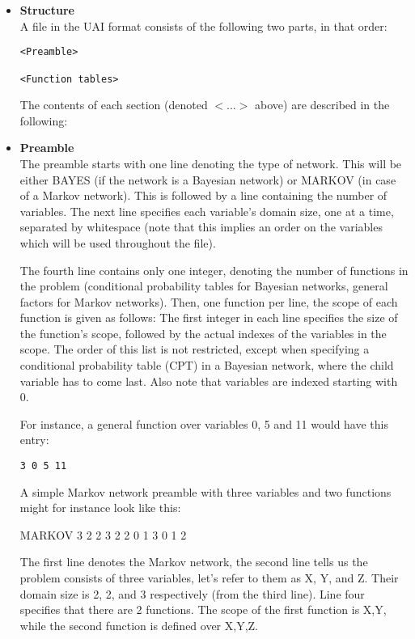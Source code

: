 \documentclass{article}
\begin{document}
\begin{itemize}
\item {\bf Structure}~\\

A file in the UAI format consists of the following two parts, in that order:
\begin{verbatim}
<Preamble>

<Function tables>
\end{verbatim}

The contents of each section (denoted $<...>$ above) are described in the following:
\item {\bf Preamble}~\\

The preamble starts with one line denoting the type of network. This will be either BAYES (if the network is a Bayesian network) or MARKOV (in case of a Markov network). This is followed by a line containing the number of variables. The next line specifies each variable's domain size, one at a time, separated by whitespace (note that this implies an order on the variables which will be used throughout the file).

The fourth line contains only one integer, denoting the number of functions in the problem (conditional probability tables for Bayesian networks, general factors for Markov networks). Then, one function per line, the scope of each function is given as follows: The first integer in each line specifies the size of the function's scope, followed by the actual indexes of the variables in the scope. The order of this list is not restricted, except when specifying a conditional probability table (CPT) in a Bayesian network, where the child variable has to come last. Also note that variables are indexed starting with 0.

For instance, a general function over variables 0, 5 and 11 would have this entry:
\begin{verbatim}
3 0 5 11
\end{verbatim}

A simple Markov network preamble with three variables and two functions might for instance look like this:

\begin{DoxyCode}
MARKOV
3
2 2 3
2
2 0 1
3 0 1 2
\end{DoxyCode}

The first line denotes the Markov network, the second line tells us the problem consists of three variables, let's refer to them as X, Y, and Z. Their domain size is 2, 2, and 3 respectively (from the third line). Line four specifies that there are 2 functions. The scope of the first function is X,Y, while the second function is defined over X,Y,Z.


\end{itemize}
\end{document}
